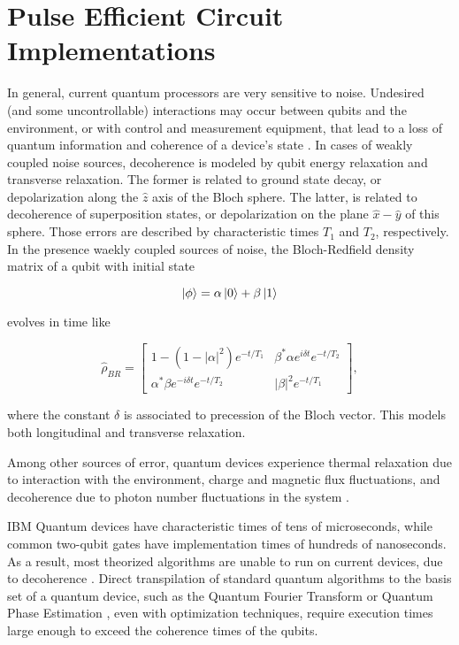     

\section{Pulse Efficient Circuit Implementations}
\label{sec:pulseFunda}

  In general, current quantum processors are very sensitive to noise. Undesired (and some uncontrollable) interactions may occur between qubits and the environment, or with control and measurement equipment, that lead to a loss of quantum information and coherence of a device's state \cite{quantumEngineer}. In cases of weakly coupled noise sources, decoherence is modeled by qubit energy relaxation and transverse relaxation. The former is related to ground state decay, or depolarization along the $\hat{z}$ axis of the Bloch sphere. The latter, is related to decoherence of superposition states, or depolarization on the plane $\hat{x}-\hat{y}$ of this sphere. Those errors are described by characteristic times $T_1$ and $T_2$, respectively. In the presence waekly coupled sources of noise, the Bloch-Redfield density matrix of a qubit with initial state

  \begin{equation}
    \ket{\phi} = \alpha \ket{0} + \beta \ket{1}
    \label{eq:BlochState}
  \end{equation}
  
  \noindent evolves in time like \cite{quantumEngineer}

  \begin{equation}
    \hat{\rho}_{BR} = \begin{bmatrix}
      1 - (1 - |\alpha|^2)e^{-t/T_1} & \beta^{*}\alpha e^{i \delta t} e^{-t/T_2} \\
      \alpha^{*}\beta e^{-i \delta t} e^{-t/T_2} & |\beta|^2e^{-t/T_1}
    \end{bmatrix},
  \end{equation}

  \noindent where the constant $\delta$ is associated to precession of the Bloch vector. This models both longitudinal and transverse relaxation.
  
  Among other sources of error, quantum devices experience thermal relaxation due to interaction with the environment, charge and magnetic flux fluctuations, and decoherence due to photon number fluctuations in the system \cite{quantumEngineer}. 
  
  IBM Quantum devices have characteristic times of tens of microseconds, while common two-qubit gates have implementation times of hundreds of nanoseconds. As a result, most theorized algorithms are unable to run on current devices, due to decoherence \cite{MajoranaSimulation, RXZPulseEfficient, QuantumChem2, QuantumChem1}. Direct transpilation of standard quantum algorithms to the basis set of a quantum device, such as the Quantum Fourier Transform or Quantum Phase Estimation \cite{Nielsen}, even with optimization techniques, require execution times large enough to exceed the coherence times of the qubits.

